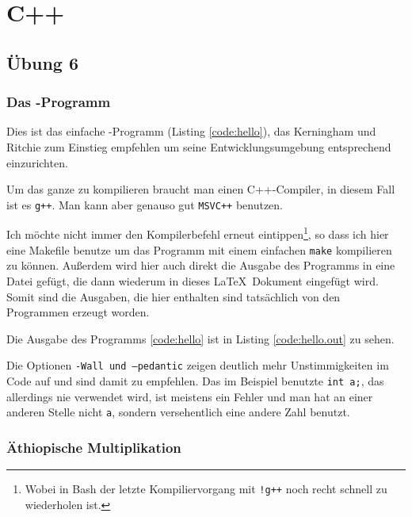 
\part{C++}

\chapter{Übung 6}

\section{Das -Programm}

Dies ist das einfache -Programm (Listing \ref{code:hello}), das Kerningham und Ritchie zum Einstieg empfehlen um seine Entwicklungsumgebung entsprechend einzurichten.\cite{ritchie}


Um das ganze zu kompilieren braucht man einen C++-Compiler, in diesem Fall ist es \texttt{g++}. Man kann aber genauso gut \texttt{MSVC++} benutzen.

Ich möchte nicht immer den Kompilerbefehl erneut eintippen\footnote{Wobei in Bash der letzte Kompiliervorgang mit \texttt{!g++} noch recht schnell zu wiederholen ist.}, so dass ich hier eine Makefile benutze um das Programm mit einem einfachen \texttt{make} kompilieren zu können. Außerdem wird hier auch direkt die Ausgabe des Programms in eine Datei gefügt, die dann wiederum in dieses \LaTeX\ Dokument eingefügt wird. Somit sind die Ausgaben, die hier enthalten sind tatsächlich von den Programmen erzeugt worden.


Die Ausgabe des Programms \ref{code:hello} ist in Listing \ref{code:hello.out} zu sehen.


Die Optionen \texttt{-Wall und --pedantic} zeigen deutlich mehr Unstimmigkeiten im Code auf und sind damit zu empfehlen. Das im Beispiel benutzte \texttt{int a;}, das allerdings nie verwendet wird, ist meistens ein Fehler und man hat an einer anderen Stelle nicht \texttt{a}, sondern versehentlich eine andere Zahl benutzt.

\section{Äthiopische Multiplikation}
\label{section:ethiopian}

